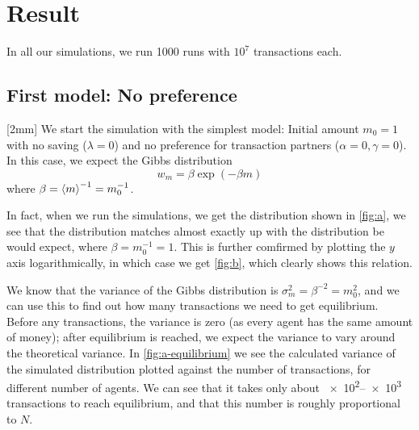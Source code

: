 \documentclass[12pt,a4paper]{article}
\newcommand\oppg[1]{\reversemarginnote{\textcolor{black!40}{#1)}}[2mm]}
\begin{document}
\clearpage

\section{Result}

In all our simulations, we run 1000 runs with $10^7$ transactions each.

\subsection{First model: No preference}

\oppg{a,b}
We start the simulation with the simplest model: Initial amount $m_0 = 1$ with no saving ($\lambda = 0$) and no preference for transaction partners ($\alpha = 0, \gamma = 0$). In this case, we expect the Gibbs distribution
\begin{equation}
  w_m = \beta \exp(-\beta m)
\end{equation}
where $\beta = \expval{m}^{-1} = m_0^{-1}$.

In fact, when we run the simulations, we get the distribution shown in \cref{fig:a}, we see that the distribution matches almost exactly up with the distribution be would expect, where $\beta = m_0^{-1} = 1$. This is further comfirmed by plotting the $y$ axis logarithmically, in which case we get \cref{fig:b}, which clearly shows this relation.

We know that the variance of the Gibbs distribution is $\sigma_m^2 = \beta^{-2} = m_0^2$, and we can use this to find out how many transactions we need to get equilibrium. Before any transactions, the variance is zero (as every agent has the same amount of money); after equilibrium is reached, we expect the variance to vary around the theoretical variance.
In \cref{fig:a-equilibrium} we see the calculated variance of the simulated distribution plotted against the number of transactions, for different number of agents. We can see that it takes only about \numrange{e2}{e3} transactions to reach equilibrium, and that this number is roughly proportional to $N$.
\end{document}
